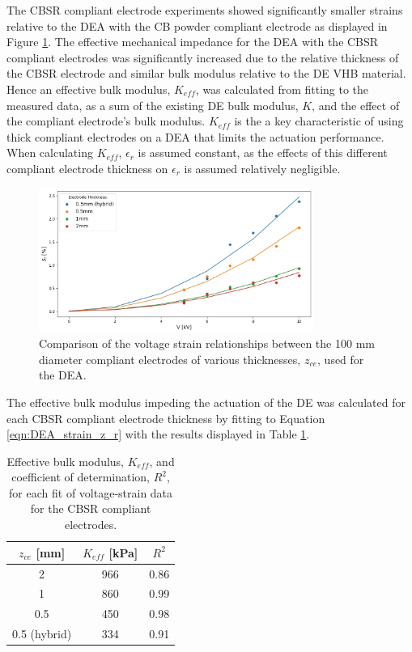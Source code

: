 The CBSR compliant electrode experiments showed significantly smaller strains relative to the DEA with the CB powder compliant electrode as displayed in Figure \ref{fig:DEA_CBSR_thickness_results}. The effective mechanical impedance for the DEA with the CBSR compliant electrodes was significantly increased due to the relative thickness of the CBSR electrode and similar bulk modulus relative to the DE VHB material. Hence an effective bulk modulus, $K_{e\!f\!f}$, was calculated from fitting to the measured data, as a sum of the existing DE bulk modulus, $K$, and the effect of the compliant electrode's bulk modulus. $K_{e\!f\!f}$ is the a key characteristic of using thick compliant electrodes on a DEA that limits the actuation performance. When calculating $K_{e\!f\!f}$, $\epsilon_r$ is assumed constant, as the effects of this different compliant electrode thickness on $\epsilon_r$ is assumed relatively negligible. %
\begin{figure}[H]
	\centering
	\includegraphics[width = 0.8\textwidth]{Figures/DEA_CBSR_thickness_strains_vs_fits_hyb.jpg}
	\vspace{0.2cm}
	\caption{Comparison of the voltage strain relationships between the 100 mm diameter compliant electrodes of various thicknesses, $z_{ce}$, used for the DEA.}
	\label{fig:DEA_CBSR_thickness_results}
\end{figure}
The effective bulk modulus impeding the actuation of the DE was calculated for each CBSR compliant electrode thickness by fitting to Equation \ref{eqn:DEA_strain_z_r} with the results displayed in Table \ref{tab:cbsr_bulk_mods}.
\begin{table}[h!]
	\begin{center}
		\caption{Effective bulk modulus, $K_{e\!f\!f}$,  and coefficient of determination, $R^2$, for each fit of voltage-strain data for the CBSR compliant electrodes.}
		\vspace{0.5cm}
		\label{tab:cbsr_bulk_mods}
		\begin{tabular}{c|c|c} %
			$z_{ce}$ [mm] & $K_{e\!f\!f}$ [kPa] & $R^2$ \\
			\hline
			2 & 966 & 0.86\\
			1 & 860 & 0.99\\
			0.5 & 450 & 0.98 \\
			0.5 (hybrid) & 334 & 0.91\\
		\end{tabular}
	\end{center}
\end{table}
